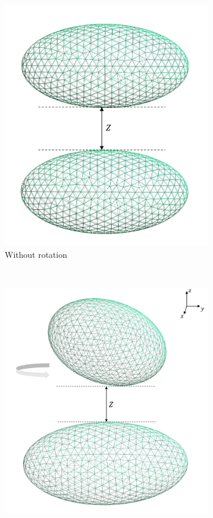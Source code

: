 \begin{figure}[H]
    \begin{subfigure}{\linewidth}
        \centering
        \includegraphics[scale = 0.4]{figures/two_ellipsoids}
        \caption{Without rotation}
        \label{Without rotation}
        \end{subfigure}\\[1ex]
    \begin{subfigure}{.5\linewidth}
    \centering
    \includegraphics[scale = 0.4]{figures/Ellipsoid_z_axis}

\end{subfigure}
\end{figure}
